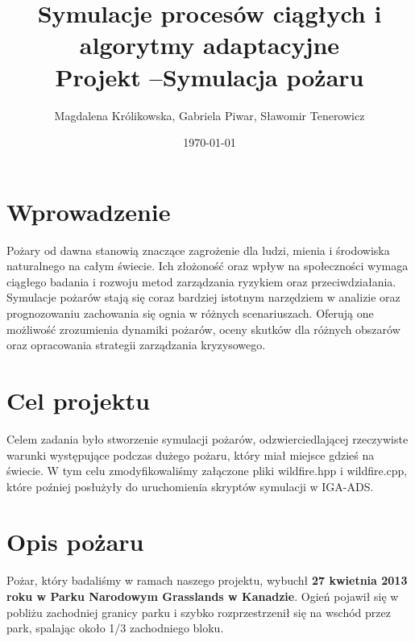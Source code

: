 \documentclass[onecolumn,12pt]{article}
\begin{document}
\title{Symulacje procesów ciągłych i algorytmy adaptacyjne\\
Projekt –Symulacja pożaru}
\author{Magdalena Królikowska, Gabriela Piwar, Sławomir Tenerowicz}
\date{\today}
\maketitle

\tableofcontents
\thispagestyle{empty}

\section{Wprowadzenie}
Pożary od dawna stanowią znaczące zagrożenie dla ludzi, mienia i środowiska naturalnego na całym świecie. Ich złożoność oraz wpływ na społeczności wymaga ciągłego badania i rozwoju metod zarządzania ryzykiem oraz przeciwdziałania. Symulacje pożarów stają się coraz bardziej istotnym narzędziem w analizie oraz prognozowaniu zachowania się ognia w różnych scenariuszach. Oferują one możliwość zrozumienia dynamiki pożarów, oceny skutków dla różnych obszarów oraz opracowania strategii zarządzania kryzysowego. 

\section{Cel projektu}
Celem zadania było stworzenie symulacji pożarów, odzwierciedlającej rzeczywiste warunki występujące podczas dużego pożaru, który miał miejsce gdzieś na świecie. W tym celu zmodyfikowaliśmy załączone pliki wildfire.hpp i wildfire.cpp, które poźniej posłużyły do uruchomienia skryptów symulacji w IGA-ADS.  

\section{Opis pożaru}
Pożar, który badaliśmy w ramach naszego projektu, wybuchł \textbf{27 kwietnia 2013 roku w Parku Narodowym Grasslands w Kanadzie}. Ogień pojawił się w pobliżu zachodniej granicy parku i szybko rozprzestrzenił się na wschód przez park, spalając około 1/3 zachodniego bloku. 
\end{document}
